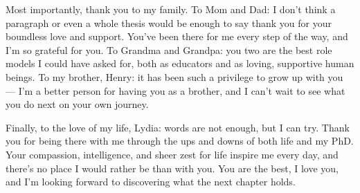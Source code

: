 Most importantly, thank you to my family. To Mom and Dad: I don't think a paragraph or even a whole thesis would be enough to say thank you for your boundless love and support. You've been there for me every step of the way, and I'm so grateful for you. To Grandma and Grandpa: you two are the best role models I could have asked for, both as educators and as loving, supportive human beings. To my brother, Henry: it has been such a privilege to grow up with you --- I'm a better person for having you as a brother, and I can't wait to see what you do next on your own journey.

Finally, to the love of my life, Lydia: words are not enough, but I can try. Thank you for being there with me through the ups and downs of both life and my PhD. Your compassion, intelligence, and sheer zest for life inspire me every day, and there's no place I would rather be than with you. You are the best, I love you, and I'm looking forward to discovering what the next chapter holds.
